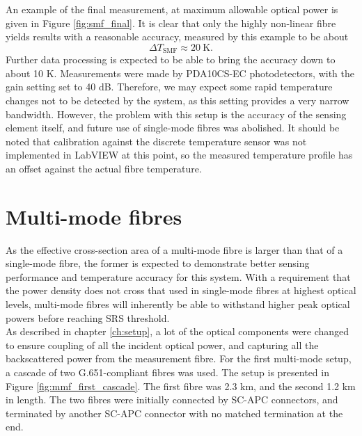 \documentclass{standalone}
\begin{document}
An example of the final measurement, at maximum allowable optical power is given in Figure \ref{fig:smf_final}.
It is clear that only the highly non-linear fibre yields results with a reasonable accuracy, measured by this example to be about 
\begin{equation}
\varDelta T_\textrm{SMF} \approx \SI{20}{\kelvin} \textrm{.}
\end{equation}
Further data processing is expected to be able to bring the accuracy down to about 10 K. Measurements were made by PDA10CS-EC photodetectors, with the gain setting set to 40 dB. Therefore, we may expect some rapid temperature changes not to be detected by the system, as this setting provides a very narrow bandwidth. However, the problem with this setup is the accuracy of the sensing element itself, and future use of single-mode fibres was abolished. It should be noted that calibration against the discrete temperature sensor was not implemented in LabVIEW at this point, so the measured temperature profile has an offset against the actual fibre temperature.

\section{Multi-mode fibres}

As the effective cross-section area of a multi-mode fibre is larger than that of a single-mode fibre, the former is expected to demonstrate better sensing performance and temperature accuracy for this system. With a requirement that the power density does not cross that used in single-mode fibres at highest optical levels, multi-mode fibres will inherently be able to withstand higher peak optical powers before reaching SRS threshold. \\

As described in chapter \ref{ch:setup}, a lot of the optical components were changed to ensure coupling of all the incident optical power, and capturing all the backscattered power from the measurement fibre. For the first multi-mode setup, a cascade of two G.651-compliant fibres was used. The setup is presented in Figure \ref{fig:mmf_first_cascade}.
The first fibre was 2.3 km, and the second 1.2 km in length. The two fibres were initially connected by SC-APC connectors, and terminated by another SC-APC connector with no matched termination at the end. \\
\end{document}
